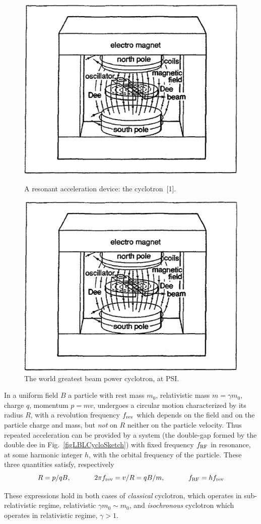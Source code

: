 \begin{figure}[ht]
\centering
\sidebyside
{
    \includegraphics[width=0.45\linewidth]{./figs_cyclo/LBLCycloSketch.eps}
    \caption{A  resonant acceleration device: the cyclotron~[1].} %
    \label{figLBLCycloSketch}
}{
    \includegraphics[width=0.45\linewidth]{./figs_cyclo/LBLCycloSketch.eps}
    \caption{The world greatest beam power cyclotron, at PSI.}
    \label{fig1.3}
}
\end{figure}

In a uniform field $B$ a  particle with rest mass $m_0$, 
relativistic mass $m=\gamma m_0$, charge $q$, momentum $p=mv$, undergoes a circular motion
characterized by its radius $R$, with a revolution frequency $f_{\rm rev}$ which depends on the field 
and on the particle charge and mass, but \emph{not} on $R$ neither on the particle velocity. 
Thus repeated acceleration can be provided by a system (the double-gap formed by the double dee in Fig.~\ref{figLBLCycloSketch}) 
with fixed frequency $f_{\rm RF}$ in resonance, at some harmonic integer $h$, 
 with the orbital frequency of the particle. These three quantities satisfy, respectively 
\begin{equation}
\label{EqRCyclo}
 R = p / qB, \hspace{.1\linewidth} 2\pi f_{\rm rev} = v/R = q B / m, \hspace{.1\linewidth} f_{\rm RF} = h f_{\rm rev}
\end{equation}

These expressions hold in both cases of  \emph{classical} cyclotron, which  operates in 
 sub-relativistic regime, relativistic  $\gamma m_0\sim m_0$, 
and  \emph{isochronous} cyclotron which operates in  relativistic regime, $\gamma > 1$.  

